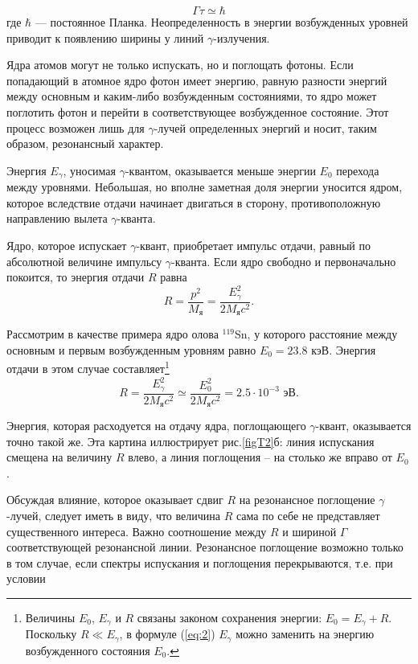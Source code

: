 \documentclass[a4paper, 12pt]{article}
\begin{document}
	\begin{equation}
		\Gamma\tau\simeq\hbar
	\end{equation}
	где $\hbar$ — постоянное Планка. Неопределенность в энергии возбужденных уровней приводит к появлению ширины у линий $\gamma$-излучения.\par
	Ядра атомов могут не только испускать, но и поглощать фотоны. Если попадающий в атомное ядро фотон имеет энергию, равную разности энергий между основным и каким-либо возбужденным состояниями, то ядро может поглотить фотон и перейти в соответствующее возбужденное состояние. Этот процесс возможен лишь для $\gamma$-лучей определенных энергий и носит, таким образом, резонансный характер.\par
	Энергия $E_\gamma$, уносимая $\gamma$-квантом, оказывается меньше энергии $E_0$ перехода между уровнями. Небольшая, но вполне заметная доля энергии уносится ядром, которое вследствие отдачи начинает двигаться в сторону, противоположную направлению вылета $\gamma$-кванта.\par
	Ядро, которое испускает $\gamma$-квант, приобретает импульс отдачи, равный по абсолютной величине импульсу $\gamma$-кванта. Если ядро свободно и первоначально покоится, то энергия отдачи $R$ равна
	\begin{equation}
		R=\frac{p^2}{M_{\text{я}}}=\frac{E_{\gamma}^2}{2M_{\text{я}}c^2}.
		\label{eq:2}
	\end{equation}
	\par
	Рассмотрим в качестве примера ядро олова $^{119}$Sn, у которого расстояние между основным и первым возбужденным уровням равно $E_0=23.8$ кэВ. Энергия отдачи в этом случае составляет\footnote{Величины $E_0$, $E_\gamma$ и $R$ связаны законом сохранения энергии: $E_0=E_\gamma+R$. Поскольку $R\ll E_\gamma$, в формуле (\ref{eq:2}) $E_\gamma$ можно заменить на энергию возбужденного состояния $E_0$.}
	\begin{equation*}
		R=\frac{E_\gamma^2}{2M_{\text{я}}c^2}\simeq\frac{E_0^2}{2M_\text{я}c^2}=2.5\cdot10^{-3}\text{ эВ}.
	\end{equation*}
	\par
	Энергия, которая расходуется на отдачу ядра, поглощающего $\gamma$-квант, оказывается точно такой же. Эта картина иллюстрирует рис.\ref{figT2}б: линия испускания смещена на величину $R$ влево, а линия поглощения – на столько же вправо от $E_0$.\par
	Обсуждая влияние, которое оказывает сдвиг $R$ на резонансное поглощение $\gamma$-лучей, следует иметь в виду, что величина $R$ сама по себе не представляет существенного интереса. Важно соотношение между $R$ и шириной $\Gamma$ соответствующей резонансной линии. Резонансное поглощение возможно только в том случае, если спектры испускания и поглощения перекрываются, т.е. при условии
\end{document}
